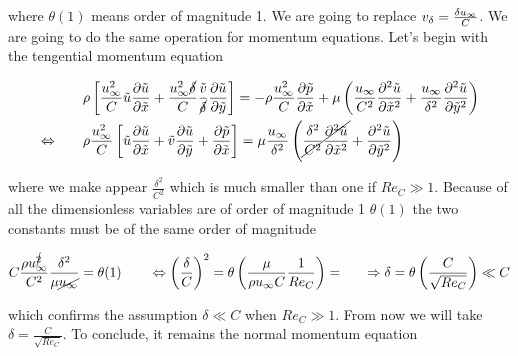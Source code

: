 	where $\theta (1)$ means order of magnitude 1. We are going to replace $v_\delta = \frac{\delta u_\infty}{C}$. We are going to do the same operation for momentum equations. Let's begin with the tengential momentum equation
	
	\begin{equation}
	\begin{aligned}
		&\rho \left[ \frac{u_\infty ^2}{C}\tilde{u} \frac{\partial \tilde{u}}{\partial \tilde{x}} + \frac{u_\infty ^2 \cancel{\delta}}{C} \frac{\tilde{v}}{\cancel{\delta}}\frac{\partial \tilde{u}}{\partial \tilde{y}} \right] = -\rho \frac{u_\infty ^2}{C} \frac{\partial \tilde{p}}{\partial \tilde{x}} + \mu \left( \frac{u_\infty}{C^2}\frac{\partial ^2 \tilde{u}}{\partial \tilde{x}^2} + \frac{u_\infty}{\delta ^2}\frac{\partial ^2 \tilde{u}}{\partial \tilde{y}^2} \right) \\
		\Leftrightarrow \qquad &\rho \frac{u_\infty ^2}{C}\left[ \tilde{u} \frac{\partial \tilde{u}}{\partial \tilde{x}} +  \tilde{v} \frac{\partial \tilde{u}}{\partial \tilde{y}} + \frac{\partial \tilde{p}}{\partial \tilde{x}}  \right] =  \mu \frac{u_\infty}{\delta ^2} \left( \cancel{\frac{\delta ^2}{C^2}\frac{\partial ^2 \tilde{u}}{\partial \tilde{x}^2}}+ \frac{\partial ^2 \tilde{u}}{\partial \tilde{y}^2} \right) \\
	\end{aligned}
	\end{equation}
	
	where we make appear $\frac{\delta ^2}{C^2}$ which is much smaller than one if $Re_C \gg 1$. Because of all the dimensionless variables are of order of magnitude 1 $\theta (1)$ the two constants must be of the same order of magnitude
	
	\begin{equation}
		C\frac{\rho u_\infty ^{\cancel{2}}}{C^2} \frac{\delta ^2}{\mu \cancel{u_\infty}} = \theta (1) \qquad \Leftrightarrow \left( \frac{\delta}{C}\right)^2 = \theta \left( \frac{\mu}{\rho u_\infty C}\frac{1}{Re _C} \right) =  \qquad \Rightarrow \delta = \theta \left(\frac{C}{\sqrt{Re_C}} \right) \ll C
	\end{equation}
	
	which confirms the assumption $\delta \ll C$ when $Re_C\gg 1$. From now we will take $\delta = \frac{C}{\sqrt{Re_C}}$. To conclude, it remains the normal momentum equation 
	
